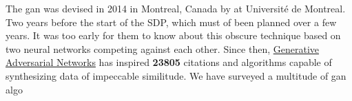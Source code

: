 The \gls{gan} was devised in 2014 in Montreal, Canada by \citeauthor{goodgan} at Université de Montreal. Two years before the start of the SDP, which must of been planned over a few years. It was too early for them to know about this obscure technique based on two neural networks competing against each other. Since then, \href{http://papers.nips.cc/paper/5423-generative-adversarial-nets}{Generative Adversarial Networks} \cite{goodgan} has inspired \textbf{23805} citations and algorithms capable of synthesizing data of impeccable similitude. We have surveyed a multitude of \gls{gan} algo

\pagebreak